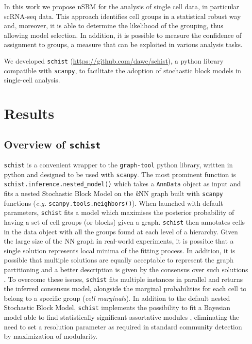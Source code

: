 \documentclass[10pt]{article}
\begin{document}
In this work we propose nSBM for the analysis of single cell data, in particular scRNA-seq data. This approach identifies cell groups in a statistical robust way and, moreover, it is able to determine the likelihood of the grouping, thus allowing model selection. In addition, it is possible to measure the confidence of assignment to groups, a measure that can be exploited in various analysis tasks.

We developed \texttt{schist} (\href{https://github.com/dawe/schist}{https:/\slash github.com\slash dawe\slash schist}), a python library compatible with \texttt{scanpy}, to facilitate the adoption of stochastic block models in single-cell analysis.

\section*{Results}

\subsection*{Overview of \texttt{schist}}

\texttt{schist} is a convenient wrapper to the \texttt{graph-tool} python library, written in python and designed to be used with \texttt{scanpy}. The most prominent function is \texttt{schist.inference.nested\_model()} which takes a \texttt{AnnData} object as input and fits a nested Stochastic Block Model on the \emph{k}NN graph built with \texttt{scanpy} functions (\emph{e.g.} \texttt{scanpy.tools.neighbors()}). When launched with default parameters, \texttt{schist} fits a model which maximises the posterior probability of having a set of cell groups (or blocks) given a graph. \texttt{schist} then annotates cells in the data object with all the groups found at each level of a hierarchy. Given the large size of the NN graph in real-world experiments, it is possible that a single solution represents local minima of the fitting process. In addition, it is possible that multiple solutions are equally acceptable to represent the graph partitioning and a better description is given by the consensus over such solutions \cite{Peixoto_2021_consensus}. To overcome these issues, \texttt{schist} fits multiple instances in parallel and returns the inferred consensus model, alongside the marginal probabilities for each cell to belong to a specific group (\emph{cell marginals}). In addition to the default nested Stochastic Block Model, \texttt{schist} implements the possibility to fit a Bayesian model able to find statistically significant assortative modules \cite{Zhang_Peixoto_2020}, eliminating the need to set a resolution parameter as required in standard community detection by maximization of modularity.
\end{document}
